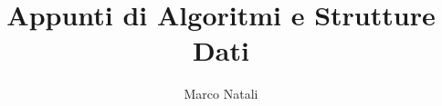 \documentclass[a4paper]{book}
\begin{document}
\title{Appunti di Algoritmi e Strutture Dati}
\author{Marco Natali}
\maketitle

\end{document}
